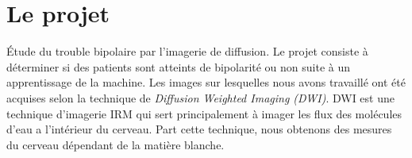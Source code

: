 \chapter{Le projet}

Étude du trouble bipolaire par l'imagerie de diffusion.
Le projet consiste à déterminer si des patients sont atteints de bipolarité ou non suite à un apprentissage de la machine. Les images sur lesquelles nous avons travaillé ont été acquises selon la technique de 
\textit{Diffusion Weighted Imaging (DWI)}.
DWI est une technique d'imagerie IRM qui sert principalement à imager les flux des molécules d'eau a l'intérieur du cerveau. Part cette technique, nous obtenons des mesures du cerveau dépendant de la matière blanche. 






